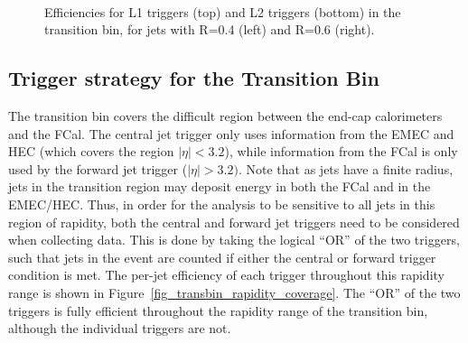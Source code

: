 \begin{figure}[tbp]
\begin{centering}
\\
\caption[Trigger efficiencies in the transition bin]{Efficiencies for L1 triggers (top) and L2 triggers (bottom) in the transition bin, for \akt jets with R=0.4 (left) and R=0.6 (right).} 
\label{figures_trans}
\end{centering}
\end{figure}



%



\subsection{Trigger strategy for the Transition Bin}
\label{section_transbin}
The transition bin covers the difficult region between the end-cap calorimeters and the FCal. The central jet trigger only uses information from the EMEC and HEC (which covers the region $|\eta|< 3.2$), while information from the FCal is only used by the forward jet trigger ($|\eta| > 3.2)$. Note that as jets have a finite radius, jets in the transition region may deposit energy in both the FCal and in the EMEC/HEC. Thus, in order for the analysis to be sensitive to all jets in this region of rapidity, both the central and forward jet triggers need to be considered when collecting data. This is done by taking the logical ``OR'' of the two triggers, such that jets in the event are counted if either the central or forward trigger condition is met. The per-jet efficiency of each trigger throughout this rapidity range is shown in Figure~\ref{fig_transbin_rapidity_coverage}. The ``OR'' of the two triggers is fully efficient throughout the rapidity range of the transition bin, although the individual triggers are not. 

